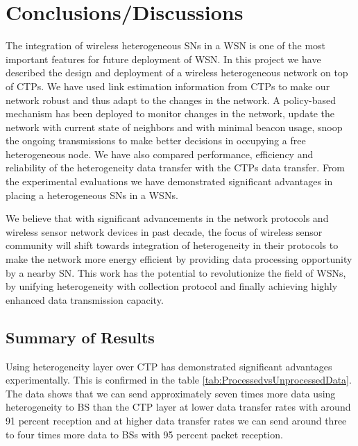
\chapter{Conclusions/Discussions}\label{ch:conclusions}

The integration of wireless heterogeneous \acp{SN} in a \ac{WSN} is one of the most important features for future deployment of \ac{WSN}. In this project we have described the design and deployment of a wireless heterogeneous network on top of \acp{CTP}. We have used link estimation information from \acp{CTP} to make our network robust and thus adapt to the changes in the network. A policy-based mechanism has been deployed to monitor changes in the network, update the network with current state of neighbors and with minimal beacon usage, snoop the ongoing transmissions to make better decisions in occupying a free heterogeneous node. We have also compared performance, efficiency and reliability of the heterogeneity data transfer with the \acp{CTP} data transfer. From the experimental evaluations we have demonstrated significant advantages in placing a heterogeneous \acp{SN} in a \acp{WSN}. 

\par
We believe that with significant advancements in the network protocols and wireless sensor network devices in past decade, the focus of wireless sensor community will shift towards integration of heterogeneity in their protocols to make the network more energy efficient by providing data processing opportunity by a nearby \ac{SN}. This work has the potential to revolutionize the field of \acp{WSN}, by unifying heterogeneity with collection protocol and finally achieving highly enhanced data transmission capacity.


\section{Summary of Results}

Using heterogeneity layer over \ac{CTP} has demonstrated significant advantages experimentally. This is confirmed in the table \ref{tab:ProcessedvsUnprocessedData}. The data shows that we can send approximately seven times more data using heterogeneity to \ac{BS} than the \ac{CTP} layer at lower data transfer rates with around 91 percent reception and at higher data transfer rates we can send around three to four times more data to \acp{BS} with 95 percent packet reception. 

